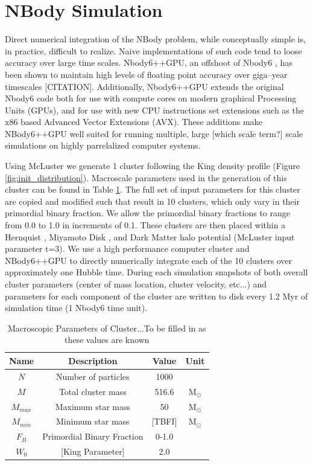 \documentclass[twocolumn]{aastex62}
\newcommand{\colorred}[1]{\color{red}#1\color{black}\hspace{0.5mm}}
\begin{document}
\section{NBody Simulation} \label{sec:nbody} 
Direct numerical integration of the NBody problem, while conceptually simple is, in practice, difficult to realize. Naive implementations of such code tend to loose accuracy over large time scales. Nbody6++GPU, an offshoot of Nbody6 \citep{Aar99}, has been shown to maintain high levels of floating point accuracy over giga--year timescales \colorred{[CITATION]}. Additionally, Nbody6++GPU extends the original Nbody6 code both for use with compute cores on modern graphical Processing Units (GPUs), and for use with new CPU instructions set extensions such as the x86 based Advanced Vector Extensions (AVX). These additions make NBody6++GPU well suited for running multiple, \colorred{large [which scale term?] scale}  simulations on highly parrelalized computer systems.

Using McLuster we generate \colorred{1} cluster following the King density profile \citep{Kin62} (Figure \ref{fig:init_distribution}). Macroscale parameters used in the generation of this cluster can be found in Table \ref{tab:macInput}. The full set of input parameters for this cluster are copied and modified such that result in \colorred{10} clusters, which only vary in their primordial binary fraction. We allow the primordial binary fractions to range from \colorred{0.0} to \colorred{1.0} in increments of \colorred{0.1}. These clusters are then placed within a Hernquist \citep{Her90}, Miyamoto Disk \citep{Miy75}, and Dark Matter halo potential (McLuster input parameter t=3). We use a high performance computer cluster and NBody6++GPU to directly numerically integrate each of the \colorred{10} clusters over approximately one Hubble time. During each simulation snapshots of both overall cluster parameters (center of mass location, cluster velocity, etc...) and parameters for each component of the cluster are written to disk every \colorred{1.2 Myr} of simulation time (\colorred{1} Nbody6 time unit).

\begin{table}
    \centering
    \begin{tabular}{c| c c c}
        \hline
        \hline
        Name & Description & Value & Unit \\
        \hline
        $N$ & Number of particles & 1000 \\
        $M$ & Total cluster mass & 516.6 & M$_{\odot}$ \\
        $M_{max}$ & Maximum star mass & 50 & M$_{\odot}$ \\
        $M_{min}$ & Minimum star mass & [TBFI] & M$_{\odot}$ \\
        $F_{B}$ & Primordial Binary Fraction & 0-1.0 \\
        $W_{0}$ & [\colorred{King Parameter}] & 2.0 \\
        
    \end{tabular}
    \caption{Macroscopic Parameters of Cluster...To be filled in as these values are known}
    \label{tab:macInput}
\end{table}
\end{document}

